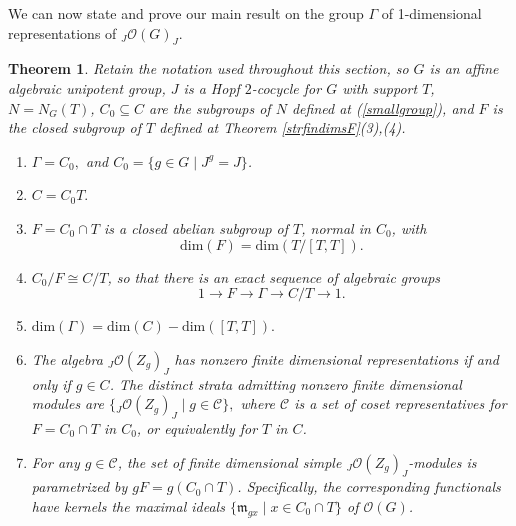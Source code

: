 \documentclass{amsart}
\numberwithin{equation}{section}
\newtheorem{theorem}{Theorem}[section]
\theoremstyle{definition}
\begin{document}
We can now state and prove our main result on the group $\Gamma$ of 1-dimensional representations of ${}_J\mathcal{O}(G)_J$.

\begin{theorem}\label{findims} 
Retain the notation used throughout this section, so $G$ is an affine algebraic unipotent group, $J$ is a Hopf $2$-cocycle for $G$ with support $T$, $N = N_G(T)$, $C_0 \subseteq C$ are the subgroups of $N$ defined at (\ref{smallgroup}), and $F$ is the closed subgroup of $T$ defined at Theorem \ref{strfindimsF}(3),(4). 
\begin{enumerate}
\item $\Gamma = C_0,$ and $C_0 = \{g \in G \mid J^g = J\}$.
\item $C = C_0T.$
\item $F=C_0 \cap T$ is a closed abelian subgroup of $T$, normal in $C_0$, with 
 $$ \mathrm{dim}(F)= \mathrm{dim}(T/[T,T]).$$
\item 
$C_0/F \cong C/T$, so that there is an exact sequence of algebraic groups
$$ 1 \rightarrow F \rightarrow \Gamma \rightarrow C/T \rightarrow 1.$$
\item 
$\mathrm{dim}(\Gamma)=\mathrm{dim}(C) - \mathrm{dim}([T,T]).$
\item 
The algebra ${}_J\mathcal{O}(Z_g)_J$ has nonzero finite dimensional representations if and only if $g\in C$. The distinct strata admitting nonzero finite dimensional modules are $\{{}_J\mathcal{O}(Z_g)_J \mid g \in \mathcal{C}\},$ where $\mathcal{C}$ is a set of coset representatives for $F=C_0 \cap T$ in $C_0$, or equivalently for $T$ in $C$.
\item 
For any $g \in \mathcal{C}$, the set of finite dimensional simple ${}_J\mathcal{O}(Z_g)_J$-modules is parametrized by $gF=g(C_0 \cap T)$. Specifically, the corresponding functionals have kernels the maximal ideals $\{\mathfrak{m}_{gx} \mid x\in C_0 \cap T \}$ of $\mathcal{O}(G)$.
\end{enumerate}
\end{theorem}
\end{document}
